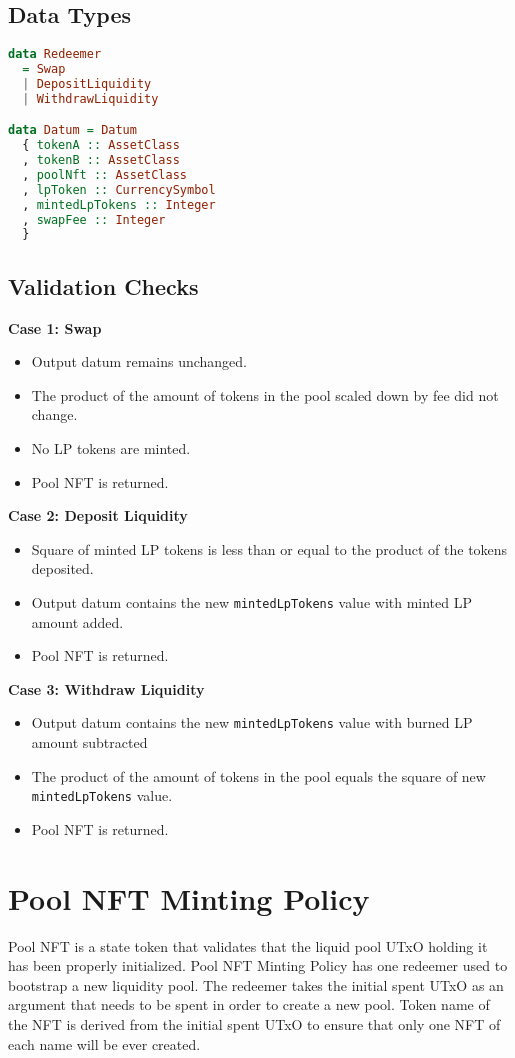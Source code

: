 \documentclass{article}
\begin{document}
\subsection{Data Types}
\begin{lstlisting}[language=Haskell]
data Redeemer
  = Swap
  | DepositLiquidity
  | WithdrawLiquidity

data Datum = Datum
  { tokenA :: AssetClass
  , tokenB :: AssetClass
  , poolNft :: AssetClass
  , lpToken :: CurrencySymbol
  , mintedLpTokens :: Integer
  , swapFee :: Integer
  }
\end{lstlisting}

\subsection{Validation Checks}
\hspace{0mm}

\textbf{Case 1: Swap}
\begin{itemize}
  \item Output datum remains unchanged.
  \item The product of the amount of tokens in the pool scaled down by fee did not change.
  \item No LP tokens are minted.
  \item Pool NFT is returned.
\end{itemize}

\textbf{Case 2: Deposit Liquidity}
\begin{itemize}
  \item Square of minted LP tokens is less than or equal to the product of the tokens deposited.
  \item Output datum contains the new \verb|mintedLpTokens| value with minted LP amount added.
  \item Pool NFT is returned.
\end{itemize}

\textbf{Case 3: Withdraw Liquidity}
\begin{itemize}
  \item Output datum contains the new \verb|mintedLpTokens| value with burned LP amount subtracted
  \item The product of the amount of tokens in the pool equals the square of new \verb|mintedLpTokens| value.
  \item Pool NFT is returned.
\end{itemize}

\section{Pool NFT Minting Policy}
Pool NFT is a state token that validates that the liquid pool UTxO holding it has been properly initialized.
Pool NFT Minting Policy has one redeemer used to bootstrap a new liquidity pool.
The redeemer takes the initial spent UTxO as an argument that needs to be spent in order to create a new pool.
Token name of the NFT is derived from the initial spent UTxO to ensure that only one NFT of each name will be ever created.
\end{document}
